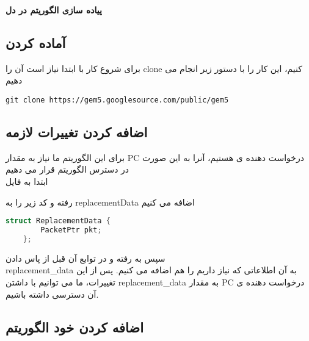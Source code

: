 \begin{center}
    \Large\textbf{پیاده سازی الگوریتم در دل 
    }
\end{center}

\subsection*{آماده کردن 
}

برای شروع کار با 
ابتدا نیاز است آن را 
clone
کنیم، این کار را با دستور زیر انجام می دهیم
\begin{latin}
\begin{lstlisting}[language=linux, caption=cloning gem5]
    git clone https://gem5.googlesource.com/public/gem5
\end{lstlisting}
\end{latin}

\subsection*{اضافه کردن تغییرات لازمه}

برای این الگوریتم ما نیاز به مقدار 
PC 
درخواست دهنده ی 
هستیم، آنرا به این صورت در دسترس الگوریتم قرار می دهیم
\\
ابتدا به فایل
\begin{latin}
\end{latin}
رفته و کد زیر را به 
replacementData
اضافه می کنیم
\begin{latin}
\begin{lstlisting}[language=C++, caption=replacementData]
    struct ReplacementData {
        PacketPtr pkt;
    };
\end{lstlisting}
\end{latin}

سپس به 
رفته و در توابع آن قبل از پاس دادن \\
replacement\_data
به آن اطلاعاتی که نیاز داریم را هم اضافه می کنیم.
پس از این تغییرات، ما می توانیم با داشتن 
replacement\_data
به مقدار 
PC
درخواست دهنده ی آن دسترسی داشته باشیم.

\subsection*{اضافه کردن خود الگوریتم}

